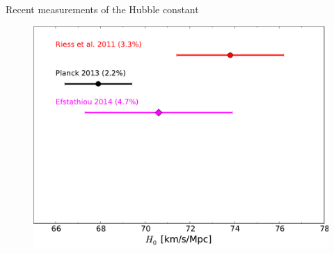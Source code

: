 \documentclass{beamer}
\begin{document}
\begin{frame}{Recent measurements of the Hubble constant}
{\begin{figure}[hbtp]
\includegraphics[width=\textwidth]{../figures/chapter-h0/H0_history-3.pdf}
\end{figure}
}
\end{frame}
\end{document}
